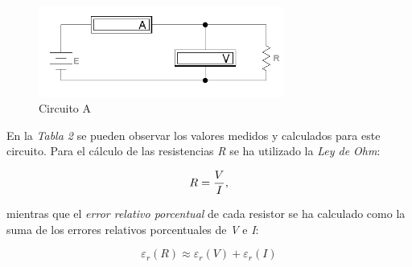 \documentclass{article}
\begin{document}

\begin{figure}[h]
	\centering
	\includegraphics[width=0.72\textwidth]{images/p2-item-a.jpg}
	\caption{Circuito A}
\end{figure}
\bigskip\bigskip


\noindent En la \textit{Tabla 2} se pueden observar los valores medidos y calculados para este circuito. Para el cálculo de las resistencias \textit{R} se ha utilizado la \textit{Ley de Ohm}:
\medskip

\begin{equation}
 	R = {V \over I},
\end{equation}
\medskip

\noindent mientras que el \textit{error relativo porcentual} de cada resistor se ha calculado como la suma de los errores relativos porcentuales de \textit{V} e \textit{I}:
\medskip

\begin{equation}
 	\varepsilon_r(R) \approx \varepsilon_r(V) + \varepsilon_r(I)
\end{equation}
\bigskip
\end{document}
